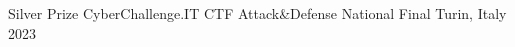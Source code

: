 



\begin{cvhonors}

	\cvhonor
	{Silver Prize} %
	{CyberChallenge.IT CTF Attack\&Defense National Final} %
	{Turin, Italy} %
	{2023} %

\end{cvhonors}
